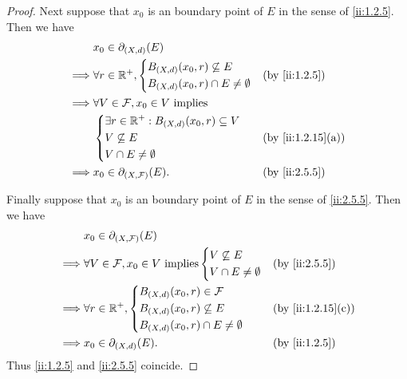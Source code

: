 \begin{proof}
  Next suppose that \(x_0\) is an boundary point of \(E\) in the sense of \cref{ii:1.2.5}.
  Then we have
  \begin{align*}
             & x_0 \in \partial_{(X, d)}(E)                                              \\
    \implies & \forall r \in \R^+, \begin{dcases}
                                     B_{(X, d)}(x_0, r) \not\subseteq E \\
                                     B_{(X, d)}(x_0, r) \cap E \neq \emptyset
                                   \end{dcases}               &  & \by{ii:1.2.5}         \\
    \implies & \forall V \in \mathcal{F}, x_0 \in V \text{ implies}                      \\
             & \begin{dcases}
                 \exists r \in \R^+ : B_{(X, d)}(x_0, r) \subseteq V \\
                 V \not\subseteq E                                   \\
                 V \cap E \neq \emptyset
               \end{dcases} &  & \by{ii:1.2.15}[a]                       \\
    \implies & x_0 \in \partial_{(X, \mathcal{F})}(E).                &  & \by{ii:2.5.5}
  \end{align*}

  Finally suppose that \(x_0\) is an boundary point of \(E\) in the sense of \cref{ii:2.5.5}.
  Then we have
  \begin{align*}
             & x_0 \in \partial_{(X, \mathcal{F})}(E)                                                 \\
    \implies & \forall V \in \mathcal{F}, x_0 \in V \text{ implies} \begin{dcases}
                                                                      V \not\subseteq E \\
                                                                      V \cap E \neq \emptyset
                                                                    \end{dcases} &  & \by{ii:2.5.5}   \\
    \implies & \forall r \in \R^+, \begin{dcases}
                                     B_{(X, d)}(x_0, r) \in \mathcal{F} \\
                                     B_{(X, d)}(x_0, r) \not\subseteq E \\
                                     B_{(X, d)}(x_0, r) \cap E \neq \emptyset
                                   \end{dcases}                            &  & \by{ii:1.2.15}[c]     \\
    \implies & x_0 \in \partial_{(X, d)}(E).                                       &  & \by{ii:1.2.5}
  \end{align*}
  Thus \cref{ii:1.2.5} and \cref{ii:2.5.5} coincide.
\end{proof}

